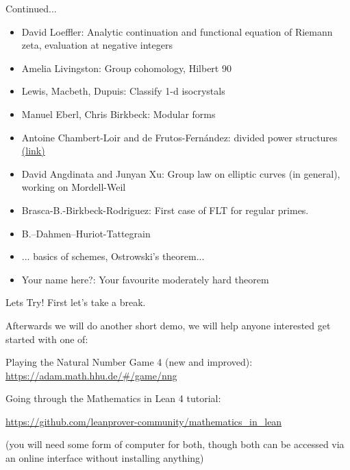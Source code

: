 \documentclass{beamer}
\theoremstyle{plain}
\begin{document}
\begin{frame}{Continued...}
    \begin{itemize}
        \item David Loeffler: Analytic continuation and functional equation of Riemann zeta, evaluation at negative integers
        \item Amelia Livingston: Group cohomology, Hilbert 90
        \item Lewis, Macbeth, Dupuis: Classify 1-d isocrystals
        \item Manuel Eberl, Chris Birkbeck: Modular forms
        \item Antoine Chambert-Loir and de Frutos-Fern\'andez: divided power structures
            \href{https://github.com/AntoineChambert-Loir/divided_powers}{(link)}
        \item David Angdinata and Junyan Xu: Group law on elliptic curves (in general), working on Mordell-Weil
        \item Brasca-B.-Birkbeck-Rodriguez: First case of FLT for regular primes.
        \item B.--Dahmen--Huriot-Tattegrain
        \item ... basics of schemes, Ostrowski's theorem...
        \item Your name here?: Your favourite moderately hard theorem
    \end{itemize}
\end{frame}

\begin{frame}{Lets Try!}
    First let's take a break.

    Afterwards we will do another short demo, we will help anyone interested get started with one of:

    Playing the Natural Number Game 4 (new and improved):
    \url{https://adam.math.hhu.de/\#/game/nng}

    Going through the Mathematics in Lean 4 tutorial:

    \url{https://github.com/leanprover-community/mathematics_in_lean}

    (you will need some form of computer for both, though both can be accessed via an online interface without installing anything)
\end{frame}

\end{document}
